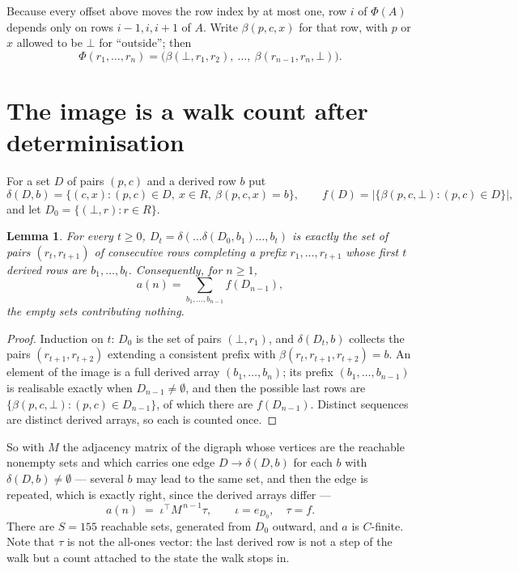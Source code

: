 \documentclass[11pt,a4paper]{article}
\theoremstyle{plain}
\newtheorem{lemma}[theorem]{Lemma}
\theoremstyle{definition}
\begin{document}
Because every offset above moves the row index by at most one, row $i$ of
$\Phi(A)$ depends only on rows $i-1,i,i+1$ of $A$. Write $\beta(p,c,x)$ for that row, with $p$
or $x$ allowed to be $\bot$ for ``outside''; then
\[
\Phi(r_1,\dots,r_n)=\bigl(\beta(\bot,r_1,r_2),\ \dots,\ \beta(r_{n-1},r_n,\bot)\bigr).
\]

\section{The image is a walk count after determinisation}

For a set $D$ of pairs $(p,c)$ and a derived row $b$ put
\[
\delta(D,b)=\{(c,x):(p,c)\in D,\ x\in R,\ \beta(p,c,x)=b\},\qquad
f(D)=\bigl|\{\beta(p,c,\bot):(p,c)\in D\}\bigr| ,
\]
and let $D_0=\{(\bot,r):r\in R\}$.

\begin{lemma}\label{lem:det}
For every $t\ge0$, $D_t=\delta(\dots\delta(D_0,b_1)\dots,b_t)$ is exactly the set of pairs
$(r_t,r_{t+1})$ of consecutive rows completing a prefix $r_1,\dots,r_{t+1}$ whose first $t$
derived rows are $b_1,\dots,b_t$. Consequently, for $n\ge1$,
\[
a(n)=\sum_{b_1,\dots,b_{n-1}}f(D_{n-1}),
\]
the empty sets contributing nothing.
\end{lemma}

\begin{proof}
Induction on $t$: $D_0$ is the set of pairs $(\bot,r_1)$, and $\delta(D_t,b)$ collects the
pairs $(r_{t+1},r_{t+2})$ extending a consistent prefix with
$\beta(r_t,r_{t+1},r_{t+2})=b$. An element of the image is a full derived array
$(b_1,\dots,b_n)$; its prefix $(b_1,\dots,b_{n-1})$ is realisable exactly when
$D_{n-1}\neq\emptyset$, and then the possible last rows are
$\{\beta(p,c,\bot):(p,c)\in D_{n-1}\}$, of which there are $f(D_{n-1})$. Distinct sequences
are distinct derived arrays, so each is counted once.
\end{proof}

So with $M$ the adjacency matrix of the digraph whose vertices are the reachable nonempty sets
and which carries one edge $D\to\delta(D,b)$ for each $b$ with $\delta(D,b)\neq\emptyset$ ---
several $b$ may lead to the same set, and then the edge is repeated, which is exactly right,
since the derived arrays differ ---
\[
a(n)\;=\;\iota^{\!\top}M^{\,n-1}\tau,\qquad \iota=e_{D_0},\quad \tau=f .
\]
There are $S=155$ reachable sets, generated from $D_0$ outward, and $a$ is $C$-finite.
Note that $\tau$ is not the all-ones vector: the last derived row is not a
step of the walk but a count attached to the state the walk stops in.
\end{document}
